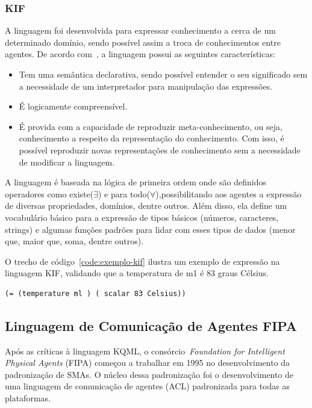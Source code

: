 \subsubsection{KIF}
A linguagem foi desenvolvida para expressar conhecimento a cerca de um determinado domínio, sendo possível assim a troca de conhecimentos entre agentes. De acordo com~\cite{kifmanual}, a linguagem possui as seguintes características:
\begin{itemize}
	\item Tem uma semântica declarativa, sendo possível entender o seu significado sem a necessidade de um interpretador para manipulação das expressões.
	\item É logicamente compreensível.
	\item É provida com a capacidade de reproduzir meta-conhecimento, ou seja, conhecimento a respeito da representação do conhecimento. Com isso, é possível reproduzir novas representações de conhecimento sem a necessidade de modificar a linguagem.
\end{itemize}

A linguagem é baseada na lógica de primeira ordem onde são definidos operadores como existe($\exists$) e para todo($\forall$),possibilitando aos agentes a expressão de diversas propriedades, domínios, dentre outros. Além disso, ela define um vocabulário básico para a expressão de tipos básicos (números, caracteres, strings) e algumas funções padrões para lidar com esses tipos de dados (menor que, maior que, soma, dentre outros). 

O trecho de código~\ref{code:exemplo-kif} ilustra um exemplo de expressão na linguagem KIF, validando que a temperatura de m1 é 83 graus Célsius.

\begin{lstlisting}[label=code:exemplo-kif,caption=Exemplo de expressão de conteúdo com a linguagem KIF. Fonte:~\cite{wooldridge04}]
(= (temperature ml ) ( scalar 83 Celsius))
\end{lstlisting}

\subsection{Linguagem de Comunicação de Agentes FIPA}

Após as críticas à linguagem KQML, o consórcio~\emph{Foundation for Intelligent Physical Agents} (FIPA) começou a trabalhar em 1995 no desenvolvimento da padronização de SMAs. O núcleo dessa padronização foi o desenvolvimento de uma linguagem de comunicação de agentes (ACL) padronizada para todas as plataformas.

